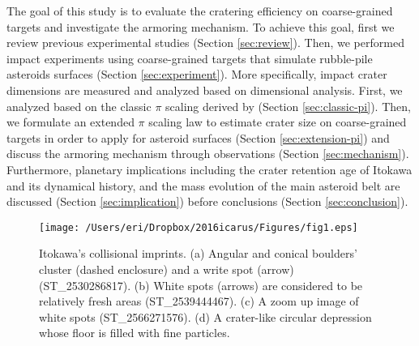 \documentclass[3p,authoryear]{elsarticle}
\begin{document}
The goal of this study is to evaluate the cratering efficiency on coarse-grained targets and investigate the armoring mechanism.
To achieve this goal, first we review previous experimental studies (Section \ref{sec:review}). Then, we performed impact experiments using coarse-grained targets that simulate rubble-pile asteroids surfaces (Section \ref{sec:experiment}).
More specifically, impact crater dimensions are measured and analyzed based on dimensional analysis.
First, we analyzed based on the classic $\pi$ scaling derived by \citet{holsapple1993} (Section \ref{sec:classic-pi}).
Then, we formulate an extended $\pi$ scaling law to estimate crater size on coarse-grained targets in order to apply for asteroid surfaces (Section \ref{sec:extension-pi}) and discuss the armoring mechanism through observations (Section \ref{sec:mechanism}).
Furthermore, planetary implications including the crater retention age of Itokawa and its dynamical history, and the mass evolution of the main asteroid belt are discussed (Section \ref{sec:implication}) before conclusions (Section \ref{sec:conclusion}).

\begin{figure*}[tbp]
	\begin{center}
	\texttt{[image: /Users/eri/Dropbox/2016icarus/Figures/fig1.eps]}
	\caption{Itokawa's collisional imprints. (a) Angular and conical boulders' cluster (dashed enclosure) and a write spot (arrow) (ST{\_}2530286817). (b) White spots (arrows) are considered to be relatively fresh areas (ST{\_}2539444467). (c) A zoom up image of white spots (ST{\_}2566271576). (d) A crater-like circular depression whose floor is filled with fine particles. \citep{nakamura2008,hirata2009}}
	\label{amica}
	\end{center}
\end{figure*}

\end{document}

